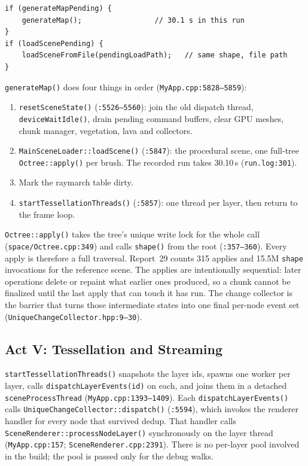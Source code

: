 \documentclass[11pt,a4paper]{article}
\begin{document}
\begin{lstlisting}
if (generateMapPending) {
    generateMap();                 // 30.1 s in this run
}
if (loadScenePending) {
    loadSceneFromFile(pendingLoadPath);   // same shape, file path
}
\end{lstlisting}

\texttt{generateMap()} does four things in order
(\texttt{MyApp.cpp:5828--5859}):

\begin{enumerate}[leftmargin=1.5em,itemsep=2pt]
\item \texttt{resetSceneState()} (\texttt{:5526--5560}): join the old
dispatch thread, \texttt{deviceWaitIdle()}, drain pending command buffers,
clear GPU meshes, chunk manager, vegetation, lava and collectors.
\item \texttt{MainSceneLoader::loadScene()} (\texttt{:5847}): the procedural
scene, one full-tree \texttt{Octree::apply()} per brush. The recorded run
takes 30.10\,s (\texttt{run.log:301}).
\item Mark the raymarch table dirty.
\item \texttt{startTessellationThreads()} (\texttt{:5857}): one thread per
layer, then return to the frame loop.
\end{enumerate}

\texttt{Octree::apply()} takes the tree's unique write lock for the whole call
(\texttt{space/Octree.cpp:349}) and calls \texttt{shape()} from the root
(\texttt{:357--360}). Every apply is therefore a full traversal. Report~29
counts 315 applies and 15.5M \texttt{shape} invocations for the reference
scene. The applies are intentionally sequential: later operations delete or
repaint what earlier ones produced, so a chunk cannot be finalized until the
last apply that can touch it has run. The change collector is the barrier
that turns those intermediate states into one final per-node event set
(\texttt{UniqueChangeCollector.hpp:9--30}).

\subsection{Act V: Tessellation and Streaming}

\texttt{startTessellationThreads()} snapshots the layer ids, spawns one
worker per layer, calls \texttt{dispatchLayerEvents(id)} on each, and joins
them in a detached \texttt{sceneProcessThread} (\texttt{MyApp.cpp:1393--1409}).
Each \texttt{dispatchLayerEvents()} calls
\texttt{UniqueChangeCollector::dispatch()} (\texttt{:5594}), which invokes the
renderer handler for every node that survived dedup. That handler calls
\texttt{SceneRenderer::processNodeLayer()} synchronously on the layer thread
(\texttt{MyApp.cpp:157}; \texttt{SceneRenderer.cpp:2391}). There is no
per-layer pool involved in the build; the pool is passed only for the debug
walks.
\end{document}
